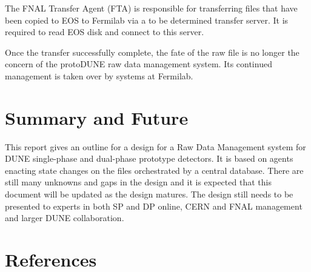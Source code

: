 \documentclass[pdftex,12pt,letter]{article}
\begin{document}
The FNAL Transfer Agent (FTA) is responsible for transferring files
that have been copied to EOS to Fermilab via a to be determined
transfer server.  It is required to read EOS disk and connect to this
server.  

Once the transfer successfully complete, the fate of the raw file is
no longer the concern of the protoDUNE raw data management system.
Its continued management is taken over by systems at Fermilab.

\section{Summary and Future}

This report gives an outline for a design for a Raw Data Management
system for DUNE single-phase and dual-phase prototype detectors.  It
is based on agents enacting state changes on the files orchestrated by
a central database.  There are still many unknowns and gaps in the
design and it is expected that this document will be updated as the
design matures.  The design still needs to be presented to experts in
both SP and DP online, CERN and FNAL management and larger DUNE
collaboration.


\section{References}

\end{document}
